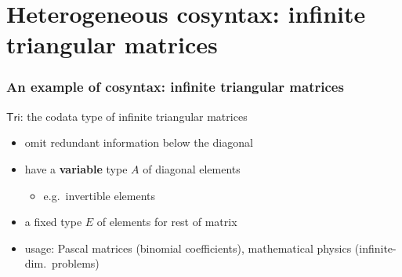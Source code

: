\documentclass[
]
{beamer}
\newcommand{\constfont}[1]{\ensuremath{\mathsf{#1}}}
\newcommand{\Tri}{\constfont{Tri}}
\newcommand{\fat}[1]{\textbf{#1}}
\begin{document}
\section{Heterogeneous cosyntax: infinite triangular matrices}

\begin{frame}
 \frametitle{An example of cosyntax: infinite triangular matrices}
 
   \begin{block}{\Tri: the codata type of infinite triangular matrices}
     \begin{itemize}
      \item omit redundant information below the diagonal
      \item have a \fat{variable} type $A$ of diagonal elements 
        \begin{itemize} 
          \item e.g.\ invertible elements
        \end{itemize}
      \item a fixed type $E$ of elements for rest of matrix
      \item usage: Pascal matrices (binomial coefficients), mathematical physics (infinite-dim.\ problems)
     \end{itemize}
   \end{block}
   
   
\begin{center}
   
 
%

\end{center}
 

   
\end{frame}
\end{document}
